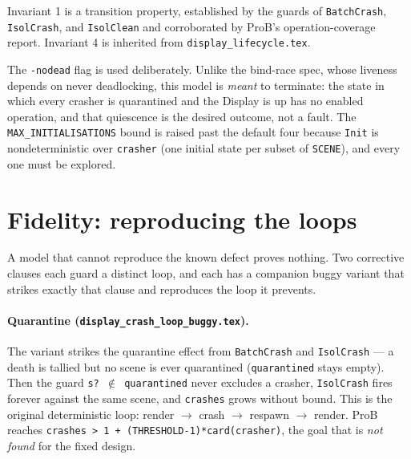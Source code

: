 \documentclass[a4paper,10pt,fleqn]{article}
\begin{document}
Invariant 1 is a transition property, established by the guards of
\texttt{BatchCrash}, \texttt{IsolCrash}, and \texttt{IsolClean} and corroborated
by ProB's operation-coverage report.  Invariant 4 is inherited from
\texttt{display\_lifecycle.tex}.

The \texttt{-nodead} flag is used deliberately.  Unlike the bind-race spec, whose
liveness depends on never deadlocking, this model is \emph{meant} to terminate:
the state in which every crasher is quarantined and the Display is up has no
enabled operation, and that quiescence is the desired outcome, not a fault.  The
\texttt{MAX\_INITIALISATIONS} bound is raised past the default four because
\texttt{Init} is nondeterministic over \texttt{crasher} (one initial state per
subset of \texttt{SCENE}), and every one must be explored.

\section{Fidelity: reproducing the loops}
\label{sec:fidelity}

A model that cannot reproduce the known defect proves nothing.  Two corrective
clauses each guard a distinct loop, and each has a companion buggy variant that
strikes exactly that clause and reproduces the loop it prevents.

\paragraph{Quarantine (\texttt{display\_crash\_loop\_buggy.tex}).}
The variant strikes the quarantine effect from \texttt{BatchCrash} and
\texttt{IsolCrash} --- a death is tallied but no scene is ever quarantined
(\texttt{quarantined} stays empty).  Then the guard \texttt{s? $\notin$
quarantined} never excludes a crasher, \texttt{IsolCrash} fires forever against
the same scene, and \texttt{crashes} grows without bound.  This is the original
deterministic loop: render $\to$ crash $\to$ respawn $\to$ render.  ProB reaches
\texttt{crashes > 1 + (THRESHOLD-1)*card(crasher)}, the goal that is \emph{not
found} for the fixed design.
\end{document}
